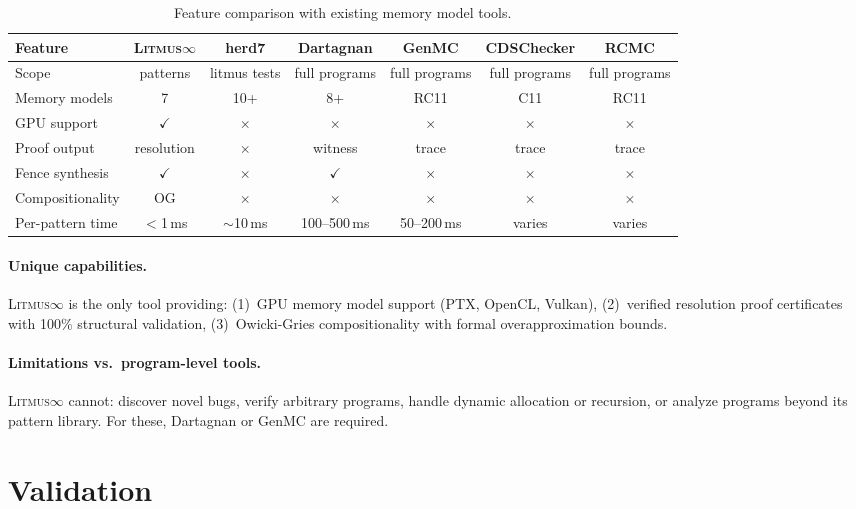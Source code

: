 \documentclass[11pt]{article}
\newcommand{\litmus}{\textsc{Litmus$\infty$}}
\newcommand{\cmark}{$\checkmark$}
\newcommand{\xmark}{$\times$}
\begin{document}
\begin{table}[ht]
\centering
\caption{Feature comparison with existing memory model tools.}
\label{tab:comparison}
\small
\begin{tabular}{lcccccc}
\toprule
\textbf{Feature} & \textbf{\litmus{}} & \textbf{herd7} &
\textbf{Dartagnan} & \textbf{GenMC} & \textbf{CDSChecker} & \textbf{RCMC} \\
\midrule
Scope & patterns & litmus tests & full programs & full programs
& full programs & full programs \\
Memory models & 7 & 10+ & 8+ & RC11 & C11 & RC11 \\
GPU support & \cmark & \xmark & \xmark & \xmark & \xmark & \xmark \\
Proof output & resolution & \xmark & witness & trace & trace & trace \\
Fence synthesis & \cmark & \xmark & \cmark & \xmark & \xmark & \xmark \\
Compositionality & OG & \xmark & \xmark & \xmark & \xmark & \xmark \\
Per-pattern time & $<$1\,ms & $\sim$10\,ms & 100--500\,ms
& 50--200\,ms & varies & varies \\
\bottomrule
\end{tabular}
\end{table}

\paragraph{Unique capabilities.}
\litmus{} is the only tool providing: (1)~GPU memory model
support (PTX, OpenCL, Vulkan), (2)~verified resolution proof
certificates with 100\% structural validation, (3)~Owicki-Gries
compositionality with formal overapproximation bounds.

\paragraph{Limitations vs.\ program-level tools.}
\litmus{} cannot: discover novel bugs, verify arbitrary programs,
handle dynamic allocation or recursion, or analyze programs beyond
its pattern library.  For these, Dartagnan or GenMC are required.

\section{Validation}
\label{sec:validation}
\end{document}
